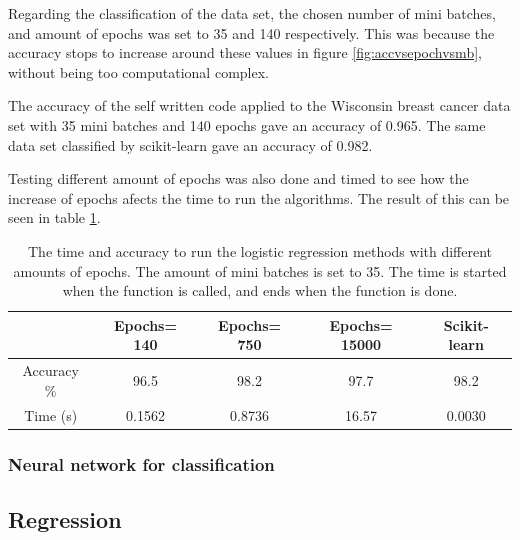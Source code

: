 \documentclass[../main.tex]{subfiles}
\begin{document}
Regarding the classification of the data set, the chosen number of mini batches, and amount of epochs was set to 35 and 140 respectively. This was because the accuracy stops to increase around these values in figure \ref{fig:accvsepochvsmb}, without being too computational complex. 

The accuracy of the self written code applied to the Wisconsin breast cancer data set with 35 mini batches and 140 epochs gave an accuracy of 0.965. The same data set classified by scikit-learn gave an accuracy of 0.982.

Testing different amount of epochs was also done and timed to see how the increase of epochs afects the time to run the algorithms. The result of this can be seen in table \ref{tab:timetime}.


\begin{table}[H]
\centering
\caption{The time and accuracy to run the logistic regression methods with different amounts of epochs. The amount of mini batches is set to 35. The time is started when the function is called, and ends when the function is done.}
\begin{tabular}{ ccccc } 
 \toprule
  & Epochs= 140 & Epochs= 750 & Epochs= 15000 & Scikit-learn \\ 
 \midrule
 Accuracy \%  & 96.5 & 98.2 & 97.7 & 98.2\\
 
 Time (s) & 0.1562 & 0.8736 & 16.57 & 0.0030 \\ 
 \bottomrule
\end{tabular}
\label{tab:timetime}
\end{table}


\subsubsection{Neural network for classification}

\subsection{Regression}
\end{document}
